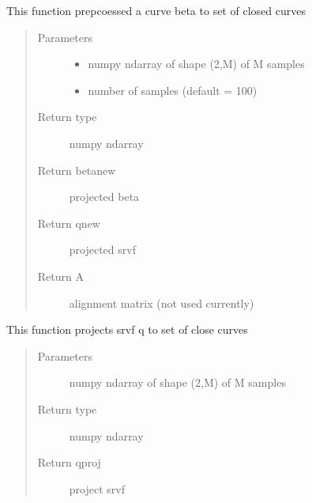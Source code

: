 \documentclass[letterpaper,10pt,english]{sphinxmanual}
\begin{document}
\begin{fulllineitems}
\label{\detokenize{curve_functions:curve_functions.pre_proc_curve}}
This function prepcoessed a curve beta to set of closed curves
\begin{quote}\begin{description}
\item[{Parameters}] \leavevmode\begin{itemize}
\item {} 
 \textendash{} numpy ndarray of shape (2,M) of M samples

\item {} 
 \textendash{} number of samples (default = 100)

\end{itemize}

\item[{Return type}] \leavevmode
numpy ndarray

\item[{Return betanew}] \leavevmode
projected beta

\item[{Return qnew}] \leavevmode
projected srvf

\item[{Return A}] \leavevmode
alignment matrix (not used currently)

\end{description}\end{quote}

\end{fulllineitems}


\begin{fulllineitems}
\label{\detokenize{curve_functions:curve_functions.project_curve}}
This function projects srvf q to set of close curves
\begin{quote}\begin{description}
\item[{Parameters}] \leavevmode
{} \textendash{} numpy ndarray of shape (2,M) of M samples

\item[{Return type}] \leavevmode
numpy ndarray

\item[{Return qproj}] \leavevmode
project srvf

\end{description}\end{quote}

\end{fulllineitems}
\end{document}
